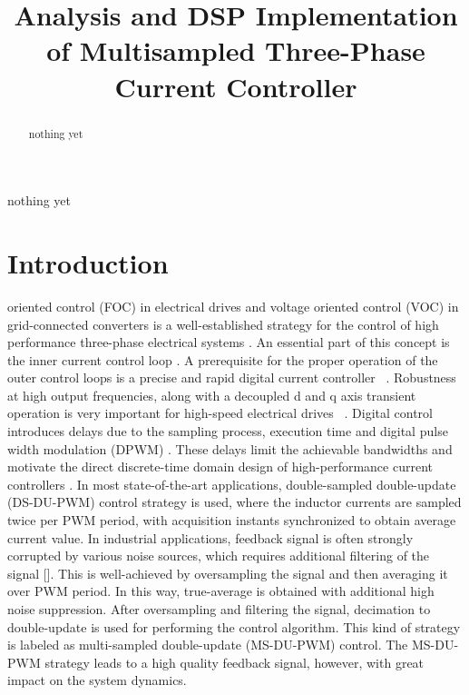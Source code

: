 \documentclass[journal]{IEEEtran}
\begin{document}
\title{Analysis and DSP Implementation of Multisampled Three-Phase Current Controller}


\maketitle

\begin{abstract}
nothing yet
\end{abstract}

\begin{IEEEkeywords}
nothing yet
\end{IEEEkeywords}


\IEEEpeerreviewmaketitle

\section{Introduction}
 oriented control (FOC) in electrical drives and voltage oriented control (VOC) in grid-connected converters is a well-established strategy for the control of high performance three-phase electrical systems \cite{holmes2012}. An essential part of this concept is the inner current control loop \cite{holmes2009}. A prerequisite for the proper operation of the outer control loops is a precise and rapid digital current controller ~\cite{yepes2014,choi1998}. Robustness at high output frequencies, along with a decoupled d and q axis transient operation is very important for high-speed electrical drives ~\cite{choi1998,hoffmann2016,yim2009}. Digital control introduces delays due to the sampling process, execution time and digital pulse width modulation (DPWM) \cite{holmes2009}. These delays limit the achievable bandwidths and motivate the direct discrete-time domain design of high-performance current controllers \cite{bae2003}. 
In most state-of-the-art applications, double-sampled double-update (DS-DU-PWM) control strategy is used, where the inductor currents are sampled twice per PWM period, with acquisition instants synchronized to obtain average current value. In industrial applications, feedback signal is often strongly corrupted by various noise sources, which requires additional filtering of the signal []. This is well-achieved by oversampling the signal and then averaging it over PWM period. In this way, true-average is obtained with additional high noise suppression. After oversampling and filtering the signal, decimation to double-update is used for performing the control algorithm. This kind of strategy is labeled as multi-sampled double-update (MS-DU-PWM) control. The MS-DU-PWM strategy leads to a high quality feedback signal, however, with great impact on the system dynamics. 
\end{document}
